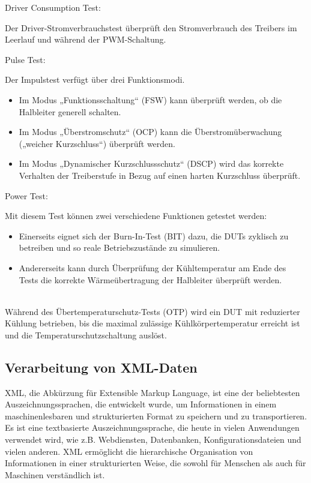 Driver Consumption Test:

Der Driver-Stromverbrauchstest überprüft den Stromverbrauch des Treibers im Leerlauf und während der PWM-Schaltung.

Pulse Test:

Der Impulstest verfügt über drei Funktionsmodi.
\begin{itemize}
    \item Im Modus „Funktionsschaltung“ (FSW) kann überprüft werden, ob die Halbleiter generell schalten.
    \item Im Modus „Überstromschutz“ (OCP) kann die Überstromüberwachung („weicher Kurzschluss“) überprüft werden.
    \item Im Modus „Dynamischer Kurzschlussschutz“ (DSCP) wird das korrekte Verhalten der Treiberstufe in Bezug auf einen harten Kurzschluss überprüft.
\end{itemize}

Power Test:

Mit diesem Test können zwei verschiedene Funktionen getestet werden:
\begin{itemize}
    \item Einerseits eignet sich der Burn-In-Test (BIT) dazu, die DUTs zyklisch zu betreiben und so reale Betriebszustände zu simulieren.
    \item Andererseits kann durch Überprüfung der Kühltemperatur am Ende des Tests die korrekte Wärmeübertragung der Halbleiter überprüft werden.
\end{itemize}
\\
Während des Übertemperaturschutz-Tests (OTP) wird ein DUT mit reduzierter Kühlung betrieben, bis die maximal zulässige
Kühlkörpertemperatur erreicht ist und die Temperaturschutzschaltung auslöst.


\subsection{Verarbeitung von XML-Daten}

XML, die Abkürzung für Extensible Markup Language, ist eine der beliebtesten Auszeichnungssprachen, die entwickelt wurde,
um Informationen in einem maschinenlesbaren und strukturierten Format zu speichern und zu transportieren.
Es ist eine textbasierte Auszeichnungssprache, die heute in vielen Anwendungen verwendet wird, wie z.B. Webdiensten,
Datenbanken, Konfigurationsdateien und vielen anderen.
XML ermöglicht die hierarchische Organisation von Informationen in einer strukturierten Weise, die sowohl für Menschen
als auch für Maschinen verständlich ist.

